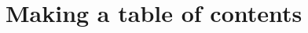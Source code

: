 \documentclass[11pt,a4paper]{article}
\author{Christian Rinderknecht}
\date{11 December 2006}
\begin{document}
\maketitle

\section{Making a table of contents}


\end{document}
